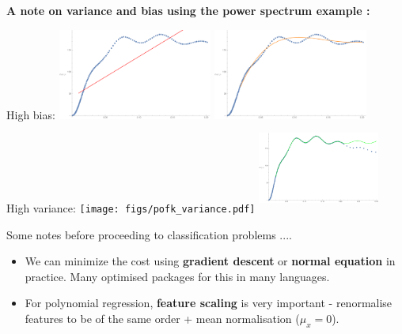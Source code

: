 \documentclass[usenames,dvipsnames]{beamer}
\begin{document}
\begin{frame}
{\bf A note on variance and bias using the power spectrum example : } 
\centering

  High bias:  \includegraphics[width=4.cm,height=3cm]{figs/pofk_bias.pdf} \pause
    \includegraphics[width=4.cm,height=3cm]{figs/pofk_optimal.pdf} \\
         \pause
   High variance:  \texttt{[image: figs/pofk\_variance.pdf]}
          \includegraphics[width=4cm,height=3cm]{figs/pofk_variance2.pdf}


\end{frame}


\begin{frame}
Some notes before proceeding to classification problems ....  \pause
\begin{itemize} 
\item
We can minimize the cost using {\bf gradient descent} or {\bf normal equation} in practice. Many optimised packages for this in many languages. \pause
\item %
For polynomial regression, {\bf feature scaling} is very important - renormalise features to be of the same order  + mean normalisation ($\mu_x=0$).  \pause
\end{itemize}

\end{frame}
\end{document}
